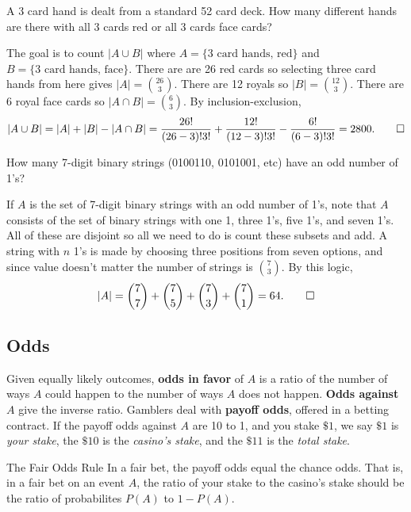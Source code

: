\begin{example}
    A 3 card hand is dealt from a standard 52 card deck. How many different hands are there with all 3 cards red or all 3 cards face cards?
\end{example}
\begin{solution}
    The goal is to count $|A \cup B|$ where $A=\{ \text{3 card hands, red} \} $ and $B= \{\text{3 card hands, face} \} $. There are are 26 red cards so selecting three card hands from here gives $|A|= {26 \choose 3} $. There are 12 royals so $|B|={12\choose 3} $. There are 6 royal face cards so $|A \cap B|={6\choose 3} $. By inclusion-exclusion, \[
        |A \cup B|=|A|+|B|-|A \cap B|= \frac{26!}{(26-3)!3!}+ \frac{12!}{(12-3)!3!}- \frac{6!}{(6-3)!3!}=2800.\qedhere
    \] 
\end{solution}
\begin{example}
    How many 7-digit binary strings (0100110, 0101001, etc) have an odd number of 1's?
\end{example}
\begin{solution}
    If $A$ is the set of 7-digit binary strings with an odd number of 1's, note that $A$ consists of the set of binary strings with one 1, three 1's, five 1's, and seven 1's. All of these are disjoint so all we need to do is count these subsets and add. A string with $n$ 1's is made by choosing three positions from seven options, and since value doesn't matter the number of strings is ${7\choose 3} $. By this logic, 
    \[
    |A|={7\choose 7} +{7\choose 5} +{7\choose 3} +{7\choose 1} =64.\qedhere
    \] 
\end{solution}

\subsection{Odds}
Given equally likely outcomes, \textbf{odds in favor}  of $A$ is a ratio of the number of ways $A$ could happen to the number of ways $A$ does not happen. \textbf{Odds against}  $A$ give the inverse ratio. Gamblers deal with \textbf{payoff odds}, offered in a betting contract. If the payoff odds against $A$ are 10 to 1, and you stake $\$1$,  we say $\$1$ is \emph{your stake}, the $\$10$ is the \emph{casino's stake}, and the $\$11$ is the \emph{total stake}.

\begin{namedthing}{The Fair Odds Rule} 
    In a fair bet, the payoff odds equal the chance odds. That is, in a fair bet on an event $A$, the ratio of your stake to the casino's stake should be the ratio of probabilites  $P(A)$ to $1-P(A)$.
\end{namedthing}

